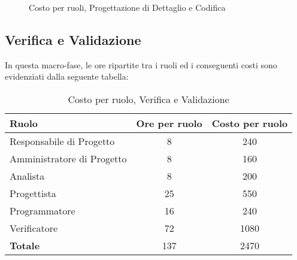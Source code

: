 \begin{figure}[h]
\centering
{}
\caption{Costo per ruoli, Progettazione di Dettaglio e Codifica}
\end{figure}

\newpage
\subsection{Verifica e Validazione}
In questa macro-fase, le ore ripartite tra i ruoli ed i conseguenti costi sono evidenziati dalla seguente tabella:

\begin{table}[h]
\centering
\begin{tabular}{|l|c|c|}
	\toprule
	\textbf{Ruolo} & \textbf{Ore per ruolo} & \textbf{Costo per ruolo} \\
		
	\midrule
	Responsabile di Progetto & 8 & 240 \\
	Amministratore di Progetto & 8 & 160 \\ 
	Analista & 8 & 200 \\
	Progettista & 25 & 550 \\
	Programmatore & 16 & 240 \\
	Verificatore & 72 & 1080 \\
	\midrule
	\textbf{Totale} & 137 & 2470 \\
		
	\bottomrule
\end{tabular}
\caption{Costo per ruolo, Verifica e Validazione}
\end{table}

